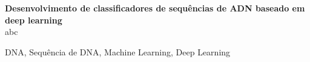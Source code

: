  {\large \textbf{Desenvolvimento de classificadores de sequências de ADN baseado em deep learning}}\\[1ex]
\noindent abc

\begin{keywords}
DNA, Sequência de DNA, Machine Learning, Deep Learning
\end{keywords}
